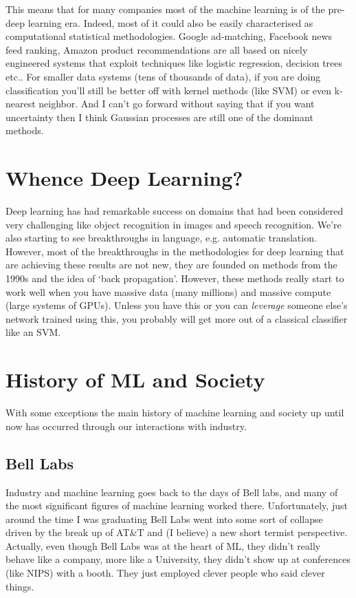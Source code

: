 \documentclass[a4paper]{caesar_book}
\begin{document}
This means that for many companies most of the machine learning is of the pre-deep learning era. Indeed, most of it could also be easily characterised as computational statistical methodologies. Google ad-matching, Facebook news feed ranking, Amazon product recommendations are all based on nicely engineered systems that exploit techniques like logistic regression, decision trees etc.. For smaller data systems (tens of thousands of data), if you are doing classification you’ll still be better off with kernel methods (like SVM) or even k-nearest neighbor. And I can’t go forward without saying that if you want uncertainty then I think Gaussian processes are still one of the dominant methods.

\section{Whence Deep Learning?}

Deep learning has had remarkable success on domains that had been considered very challenging like object recognition in images and speech recognition. We’re also starting to see breakthroughs in language, e.g. automatic translation. However, most of the breakthroughs in the methodologies for deep learning that are achieving these results are not new, they are founded on methods from the 1990s and the idea of ‘back propagation’. However, these methods really start to work well when you have massive data (many millions) and massive compute (large systems of GPUs). Unless you have this or you can \textit{leverage} someone else’s network trained using this, you probably will get more out of a classical classifier like an SVM.

\section{History of ML and Society}

With some exceptions the main history of machine learning and society up until now has occurred through our interactions with industry.

\subsection{Bell Labs}

Industry and machine learning goes back to the days of Bell labs, and many of the most significant figures of machine learning worked there. Unfortunately, just around the time I was graduating Bell Labs went into some sort of collapse driven by the break up of AT\&T and (I believe) a new short termist perspective. Actually, even though Bell Labs was at the heart of ML, they didn't really behave like a company, more like a University, they didn't show up at conferences (like NIPS) with a booth. They just employed clever people who said clever things.
\end{document}
